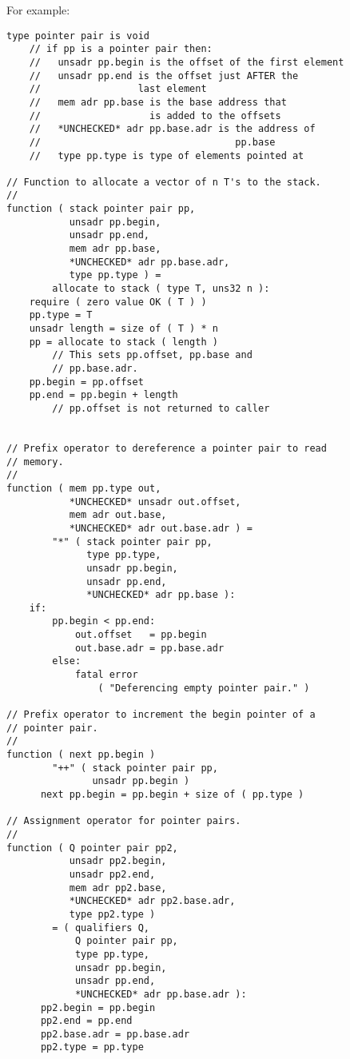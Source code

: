 \documentclass[12pt]{article}
\newenvironment{indpar}[1][0.3in]%
	{\begin{list}{}%
		     {\setlength{\itemsep}{0in}%
		      \setlength{\topsep}{0in}%
		      \setlength{\parsep}{1ex}%
		      \setlength{\labelwidth}{#1}%
		      \setlength{\leftmargin}{#1}%
		      \addtolength{\leftmargin}{\labelsep}}%
	 \item}%
	{\end{list}}
\begin{document}
For example:
\begin{indpar}\begin{verbatim}
type pointer pair is void
    // if pp is a pointer pair then:
    //   unsadr pp.begin is the offset of the first element
    //   unsadr pp.end is the offset just AFTER the
    //                 last element
    //   mem adr pp.base is the base address that
    //                   is added to the offsets
    //   *UNCHECKED* adr pp.base.adr is the address of
    //                                  pp.base
    //   type pp.type is type of elements pointed at

// Function to allocate a vector of n T's to the stack.
//
function ( stack pointer pair pp,
           unsadr pp.begin,
           unsadr pp.end,
           mem adr pp.base,
           *UNCHECKED* adr pp.base.adr,
           type pp.type ) =
        allocate to stack ( type T, uns32 n ):
    require ( zero value OK ( T ) )
    pp.type = T
    unsadr length = size of ( T ) * n
    pp = allocate to stack ( length )
        // This sets pp.offset, pp.base and
        // pp.base.adr.
    pp.begin = pp.offset
    pp.end = pp.begin + length
        // pp.offset is not returned to caller


// Prefix operator to dereference a pointer pair to read
// memory.
//
function ( mem pp.type out,
           *UNCHECKED* unsadr out.offset,
           mem adr out.base,
           *UNCHECKED* adr out.base.adr ) =
        "*" ( stack pointer pair pp,
              type pp.type,
              unsadr pp.begin,
              unsadr pp.end,
              *UNCHECKED* adr pp.base ):
    if:
        pp.begin < pp.end:
            out.offset   = pp.begin
            out.base.adr = pp.base.adr
        else:
            fatal error
                ( "Deferencing empty pointer pair." )

// Prefix operator to increment the begin pointer of a
// pointer pair.
//
function ( next pp.begin )
        "++" ( stack pointer pair pp,
               unsadr pp.begin )
      next pp.begin = pp.begin + size of ( pp.type )

// Assignment operator for pointer pairs.
//
function ( Q pointer pair pp2,
           unsadr pp2.begin,
           unsadr pp2.end,
           mem adr pp2.base,
           *UNCHECKED* adr pp2.base.adr,
           type pp2.type )
        = ( qualifiers Q,
            Q pointer pair pp,
            type pp.type,
            unsadr pp.begin,
            unsadr pp.end,
            *UNCHECKED* adr pp.base.adr ):
      pp2.begin = pp.begin
      pp2.end = pp.end
      pp2.base.adr = pp.base.adr
      pp2.type = pp.type


\end{verbatim}
\end{indpar}
\end{document}
